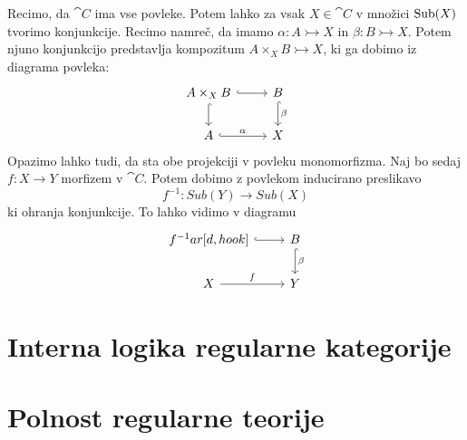 \documentclass[../kategoricna_logika.tex]{subfiles}
\begin{document}
Recimo, da $\cat{C}$ ima vse povleke. Potem lahko za vsak $X \in \cat{C}$ v množici $\operatorname{Sub}(X)$ tvorimo konjunkcije. Recimo namreč, da imamo $\alpha : A \rightarrowtail X$ in $\beta : B \rightarrowtail X$. Potem njuno konjunkcijo predstavlja kompozitum $A \times_X B \rightarrowtail X$, ki ga dobimo iz diagrama povleka:
\begin{equation*}
    \begin{tikzcd}
        A \times_X B \ar[r, hook] \ar[d, hook] & B \ar[d, hook, "\beta"] \\
        A \ar[r, hook, "\alpha"] & X
    \end{tikzcd}
\end{equation*}
Opazimo lahko tudi, da sta obe projekciji v povleku monomorfizma. Naj bo sedaj $f : X \to Y$ morfizem v $\cat{C}$. Potem dobimo z povlekom inducirano preslikavo
$$f^{-1} : Sub(Y) \to Sub(X)$$
ki ohranja konjunkcije. To lahko vidimo v diagramu
\begin{equation*}
    \begin{tikzcd}
        f^{-1} \ar[r, hook] ar[d, hook] & B \ar[d, hook, "\beta"] \\
        X \ar[r, "f"] & Y
    \end{tikzcd}
\end{equation*}

%
\section{Interna logika regularne kategorije}
%
\section{Polnost regularne teorije}
\end{document}
